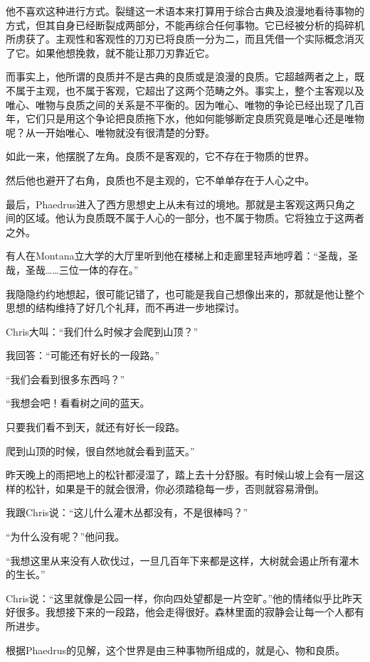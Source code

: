 \documentclass[UTF8]{article}
\begin{document}
\par 他不喜欢这种进行方式。裂缝这一术语本来打算用于综合古典及浪漫地看待事物的方式，但其自身已经断裂成两部分，不能再综合任何事物。它已经被分析的捣碎机所虏获了。主观性和客观性的刀刃已将良质一分为二，而且凭借一个实际概念消灭了它。如果他想挽救，就不能让那刀刃靠近它。
\par 而事实上，他所谓的良质并不是古典的良质或是浪漫的良质。它超越两者之上，既不属于主观，也不属于客观，它超出了这两个范畴之外。事实上，整个主客观以及唯心、唯物与良质之间的关系是不平衡的。因为唯心、唯物的争论已经出现了几百年，它们只是用这个争论把良质拖下水，他如何能够断定良质究竟是唯心还是唯物呢？从一开始唯心、唯物就没有很清楚的分野。
\par 如此一来，他摆脱了左角。良质不是客观的，它不存在于物质的世界。
\par 然后他也避开了右角，良质也不是主观的，它不单单存在于人心之中。
\par 最后，Phaedrus进入了西方思想史上从未有过的境地。那就是主客观这两只角之间的区域。他认为良质既不属于人心的一部分，也不属于物质。它将独立于这两者之外。
\par 有人在Montana立大学的大厅里听到他在楼梯上和走廊里轻声地哼着：“圣哉，圣哉，圣哉……三位一体的存在。”
\par 我隐隐约约地想起，很可能记错了，也可能是我自己想像出来的，那就是他让整个思想的结构维持了好几个礼拜，而不再进一步地探讨。
\par Chris大叫：“我们什么时候才会爬到山顶？”
\par 我回答：“可能还有好长的一段路。”
\par “我们会看到很多东西吗？”
\par “我想会吧！看看树之间的蓝天。
\par 只要我们看不到天，就还有好长一段路。
\par 爬到山顶的时候，很自然地就会看到蓝天。”
\par 昨天晚上的雨把地上的松针都浸湿了，踏上去十分舒服。有时候山坡上会有一层这样的松针，如果是干的就会很滑，你必须踏稳每一步，否则就容易滑倒。
\par 我跟Chris说：“这儿什么灌木丛都没有，不是很棒吗？”
\par “为什么没有呢？”他问我。
\par “我想这里从来没有人砍伐过，一旦几百年下来都是这样，大树就会遏止所有灌木的生长。”
\par Chris说：“这里就像是公园一样，你向四处望都是一片空旷。”他的情绪似乎比昨天好很多。我想接下来的一段路，他会走得很好。森林里面的寂静会让每一个人都有所进步。
\par 根据Phaedrus的见解，这个世界是由三种事物所组成的，就是心、物和良质。
\end{document}
